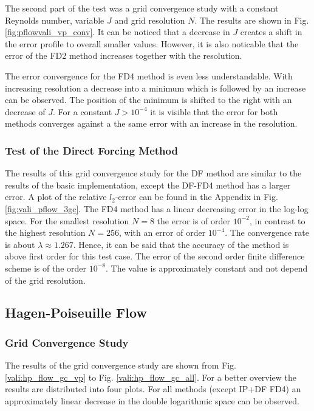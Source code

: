 The second part of the test was a grid convergence study with a constant Reynolds number, variable $J$ and grid resolution $N$.
The results are shown in Fig. \ref{fig:pflowvali_vp_conv}.
It can be noticed that a decrease in $J$ creates a shift in the error profile to overall smaller values.
However, it is also noticable that the error of the FD2 method increases together with the resolution.

The error convergence for the FD4 method is even less understandable.
With increasing resolution  a decrease into a minimum which is followed by an increase can be observed.
The position of the minimum is shifted to the right with an decrease of $J$.
For a constant $J>10^{-4}$ it is visible that the error for both methods converges against a
the same error  with an increase in the resolution.

\clearpage

\subsubsection{Test of the Direct Forcing Method}

The results of this grid convergence study for the DF method
are similar to the results of the basic implementation, except the DF-FD4 method has a larger error.
A plot of the relative $l_2$-error can be found in the Appendix in Fig.\ref{fig:vali_pflow_3gc}.
The FD4 method has a linear decreasing error in the log-log space.
For the smallest resolution $N=8$ the error is of order $10^{-2}$,
in contrast to the highest resolution $N=256$, with an error of order $10^{-4}$.
The convergence rate is about $\lambda\approx1.267$.
Hence, it can be said that the accuracy of the method is above first order for this test case.
The error of the second order finite difference scheme is of the order $10^{-8}$.
The value is approximately constant and not depend of the grid resolution.

\subsection{Hagen-Poiseuille Flow}

\subsubsection{Grid Convergence Study}

The results of the grid convergence study are shown from Fig. \ref{vali:hp_flow_gc_vp} to Fig. \ref{vali:hp_flow_gc_all}.
For a better overview the results are distributed into four plots.
For all methods (except IP+DF FD4) an approximately linear decrease in the double logarithmic space can be observed.

